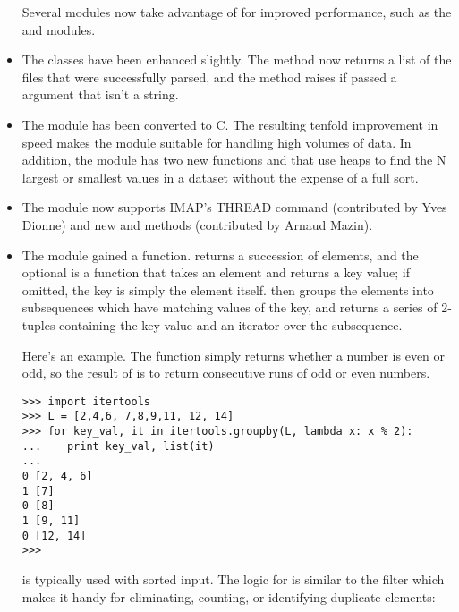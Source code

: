 \documentclass{howto}
\begin{document}
\begin{itemize}
Several modules now take advantage of  for
improved performance, such as the  and
 modules.

\item The  classes have been enhanced slightly.
   The  method now returns a list of the files that
   were successfully parsed, and the  method raises
    if passed a  argument that isn't a
   string.

\item The  module has been converted to C.  The resulting
   tenfold improvement in speed makes the module suitable for handling
   high volumes of data.  In addition, the module has two new functions
    and  that use heaps to
   find the N largest or smallest values in a dataset without the
   expense of a full sort.

\item The  module now supports IMAP's THREAD command
(contributed by Yves Dionne) and new  and
 methods (contributed by Arnaud Mazin).

\item The  module gained a
   function.
   returns a succession of elements, and the optional
   is a function that takes an element and returns a key
  value; if omitted, the key is simply the element itself.
   then groups the elements into subsequences
  which have matching values of the key, and returns a series of 2-tuples
  containing the key value and an iterator over the subsequence.
 
Here's an example.  The  function simply returns whether a
number is even or odd, so the result of  is to
return consecutive runs of odd or even numbers.

\begin{verbatim}
>>> import itertools
>>> L = [2,4,6, 7,8,9,11, 12, 14]
>>> for key_val, it in itertools.groupby(L, lambda x: x % 2):
...    print key_val, list(it)
... 
0 [2, 4, 6]
1 [7]
0 [8]
1 [9, 11]
0 [12, 14]
>>> 
\end{verbatim}

 is typically used with sorted input.  The logic
for  is similar to the \UNIX{}  filter
which makes it handy for eliminating, counting, or identifying
duplicate elements:


\end{itemize}
\end{document}

